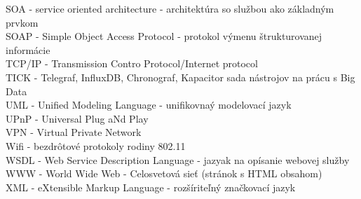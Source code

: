 SOA - service oriented architecture - architektúra so službou ako základným prvkom \\
SOAP - Simple Object Access Protocol - protokol výmenu štrukturovanej informácie \\
TCP/IP - Transmission Contro Protocol/Internet protocol \\ 
TICK - Telegraf, InfluxDB, Chronograf, Kapacitor sada nástrojov na prácu s Big Data\\
UML - Unified Modeling Language - unifikovnaý modelovací jazyk \\
UPnP - Universal Plug aNd Play \\
VPN - Virtual Private Network \\
Wifi - bezdrôtové protokoly rodiny 802.11 \\
WSDL - Web Service Description Language - jazyak na opísanie webovej služby \\
WWW - World Wide Web - Celosvetová sieť (stránok s HTML obsahom) \\
XML - eXtensible Markup Language - rozšíriteľný značkovací jazyk
